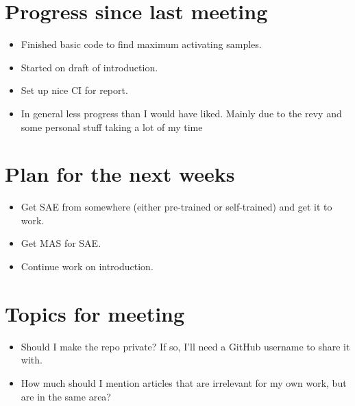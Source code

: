 \documentclass[main.tex]{subfiles}
\begin{document}
\section*{Progress since last meeting}
\begin{itemize}
    \item Finished basic code to find maximum activating samples.
    \item Started on draft of introduction.
    \item Set up nice CI for report.
    \item In general less progress than I would have liked.
    Mainly due to the revy and some personal stuff taking a lot of my time
\end{itemize}
\section*{Plan for the next weeks}
\begin{itemize}
    \item Get SAE from somewhere (either pre-trained or self-trained) and get it to work.
    \item Get MAS for SAE.
    \item Continue work on introduction.
\end{itemize}
\section*{Topics for meeting}
\begin{itemize}
    \item Should I make the repo private? If so, I'll need a GitHub username to share it with.
    \item How much should I mention articles that are irrelevant for my own work, but are in the same area?
\end{itemize}
\end{document}
